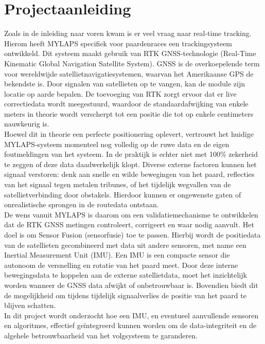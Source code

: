 
\section{Projectaanleiding}
Zoals in de inleiding naar voren kwam is er veel vraag naar real-time tracking. Hierom heeft MYLAPS specifiek voor paardenraces een trackingsysteem ontwikkeld. Dit systeem maakt gebruik van RTK GNSS-technologie (Real-Time Kinematic Global Navigation Satellite System). GNSS is de overkoepelende term voor wereldwijde satellietnavigatiesystemen, waarvan het Amerikaanse GPS de bekendste is. Door signalen van satellieten op te vangen, kan de module zijn locatie op aarde bepalen. De toevoeging van RTK zorgt ervoor dat er live correctiedata wordt meegestuurd, waardoor de standaardafwijking van enkele meters in theorie wordt verscherpt tot een positie die tot op enkele centimeters nauwkeurig is. \\

Hoewel dit in theorie een perfecte positionering oplevert, vertrouwt het huidige MYLAPS-systeem momenteel nog volledig op de ruwe data en de eigen foutmeldingen van het systeem. In de praktijk is echter niet met 100\% zekerheid te zeggen of deze data daadwerkelijk klopt. Diverse externe factoren kunnen het signaal verstoren: denk aan snelle en wilde bewegingen van het paard, reflecties van het signaal tegen metalen tribunes, of het tijdelijk wegvallen van de satellietverbinding door obstakels. Hierdoor kunnen er ongewenste gaten of onrealistische sprongen in de routedata ontstaan. \\

De wens vanuit MYLAPS is daarom om een validatiemechanisme te ontwikkelen dat de RTK GNSS metingen controleert, corrigeert en waar nodig aanvult. Het doel is om Sensor Fusion (sensorfusie) toe te passen. Hierbij wordt de positiedata van de satellieten gecombineerd met data uit andere sensoren, met name een Inertial Measurement Unit (IMU). Een IMU is een compacte sensor die autonoom de versnelling en rotatie van het paard meet. Door deze interne bewegingsdata te koppelen aan de externe satellietdata, moet het inzichtelijk worden wanneer de GNSS data afwijkt of onbetrouwbaar is. Bovendien biedt dit de mogelijkheid om tijdens tijdelijk signaalverlies de positie van het paard te blijven schatten. \\

In dit project wordt onderzocht hoe een IMU, en eventueel aanvullende sensoren en algoritmes, effectief geïntegreerd kunnen worden om de data-integriteit en de algehele betrouwbaarheid van het volgsysteem te garanderen.

\newpage